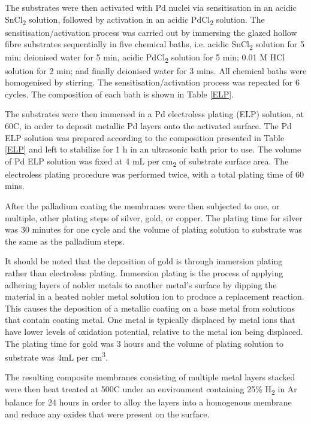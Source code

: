 The substrates were then activated with Pd nuclei via sensitisation in an acidic SnCl\textsubscript{2} solution, followed by activation in an acidic PdCl\textsubscript{2} solution. The sensitisation/activation 
process was carried out by immersing the glazed hollow fibre substrates sequentially in five chemical baths, i.e. acidic SnCl\textsubscript{2} solution for 5 min; deionised water for 5 min, acidic PdCl\textsubscript{2} solution for 5 min; 0.01 M HCl solution for 2 min; and finally deionised water for 3 mins. 
All chemical baths were homogenised by stirring. The sensitisation/activation process was repeated for 6 cycles. The composition of each bath is shown in Table \ref{ELP}.

The substrates were then immersed in a Pd electroless plating (ELP) solution, at 60\textdegree C, in order to deposit metallic Pd layers onto the activated surface. The Pd ELP solution was prepared according to the composition presented in Table \ref{ELP} and left to stabilize for 1 h in an ultrasonic bath prior to use. The volume of Pd ELP solution was fixed at 4 mL per cm\textsubscript{2} of 
substrate surface area. The electroless plating procedure was performed twice, with a total plating time of 60 mins.

After the palladium coating the membranes were then subjected to one, or multiple, other plating steps of silver, gold, or copper. The plating time for silver was 30 minutes for one cycle and the volume of plating solution to substrate was the same as the palladium steps.

It should be noted that the deposition of gold is through immersion plating rather than electroless plating. Immersion plating is the process of applying adhering layers of nobler metals to another metal's surface by dipping the material in a heated nobler metal solution ion to produce a replacement reaction. This causes the deposition of a metallic coating on a base metal from solutions that contain coating metal. One metal is typically displaced by metal ions that have lower levels of oxidation potential, relative to the metal ion being displaced. The plating time for gold was 3 hours and the volume of plating solution to substrate was 4mL per cm\textsuperscript{3}. 

The resulting composite membranes consisting of multiple metal layers stacked were then heat treated at 500\textdegree C under an environment containing 25\% H\textsubscript{2} in Ar balance for 24 hours in order to alloy the layers into a homogenous membrane and reduce any oxides that were present on the surface.

